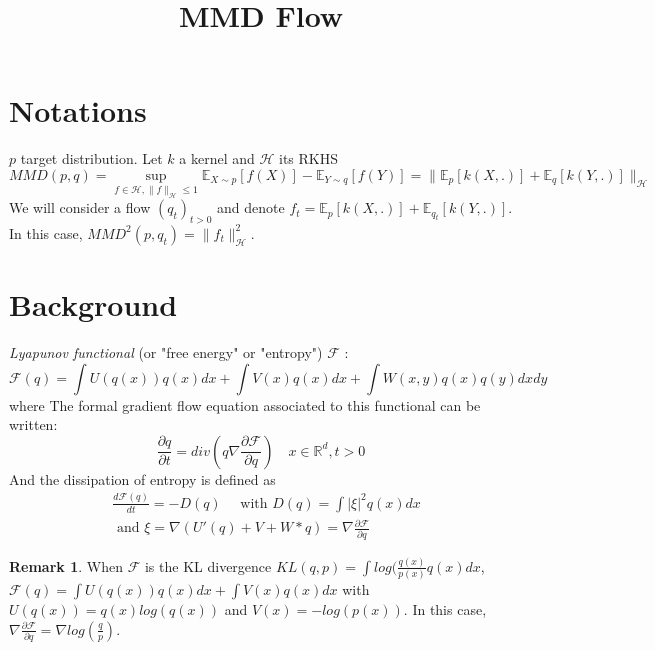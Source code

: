 \documentclass{article}
\title{MMD Flow}
\newcommand{\1}{\mathbbm 1}
\newcommand{\R}{{{\mathbb R}}}
\newcommand{\E}{{{\mathbb E}}}
\newcommand{\kH}{{{\mathcal H}}}
\newcommand{\F}{{{\mathcal F}}}
\theoremstyle{definition}
\newtheorem{remark}{Remark}
\begin{document}
\maketitle


\begin{abstract} 

\end{abstract}

\section{Notations}
$p$ target distribution. Let $k$ a kernel and $\kH$ its RKHS
\begin{equation}
    MMD(p,q)=\sup_{f \in \kH,  \|f\|_{\kH}\le 1} \E_{X \sim p}[f(X)]-\E_{Y \sim q}[f(Y)]=\|\E_{p}[k(X,.)] + \E_{q}[k(Y,.)]\|_{\kH}
\end{equation}
We will consider a flow $(q_t)_{t>0}$ and denote $f_t=\E_{p}[k(X,.)] + \E_{q_t}[k(Y,.)]$. In this case, $MMD^2(p,q_t)=\|f_t\|^2_{\kH}$.


\section{Background}

\textit{Lyapunov functional} (or "free energy" or "entropy") $\F$  \citep{villani2004trend}:
\begin{equation}
    \F(q)=\int U(q(x)) q(x)dx + \int V(x)q(x)dx + \int W(x,y)q(x)q(y)dxdy
\end{equation}
where 
The formal gradient flow equation associated to this functional can be written:
\begin{equation}
    \frac{\partial q}{\partial t}= div( q \nabla \frac{\partial \F}{\partial q}) \quad x \in \R^d , t>0
\end{equation}
And the dissipation of entropy is defined as %
\begin{align}
    &        \frac{d \F(q)}{dt} =-D(q) \quad \text{ with } D(q)= \int |\xi|^2 q(x)dx\\
    &\text{ and } \xi= \nabla (U'(q) + V + W * q)= \nabla \frac{\partial \F}{\partial q}
\end{align}

\begin{remark} When $\F$ is the KL divergence $KL(q,p)=\int log(\frac{q(x)}{p(x)}q(x)dx$, $\F(q)=\int U(q(x))q(x)dx + \int V(x) q(x)dx$ with $U(q(x))=q(x)log(q(x))$ and $V(x)=-log(p(x))$. In this case, $\nabla \frac{\partial \F}{\partial q}= \nabla log(\frac{q}{p})$.
\end{remark}
\end{document}
